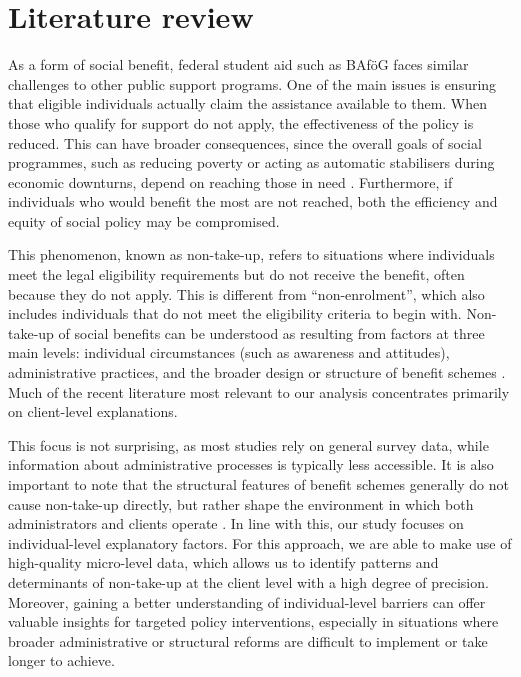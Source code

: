 \section{Literature review}
\label{section:literature_review}

As a form of social benefit, federal student aid such as BAföG faces similar challenges to other public support programs. One of the main issues is ensuring that eligible individuals actually claim the assistance available to them. When those who qualify for support do not apply, the effectiveness of the policy is reduced. This can have broader consequences, since the overall goals of social programmes, such as reducing poverty or acting as automatic stabilisers during economic downturns, depend on reaching those in need \citep{goedeme_concept_2020}. Furthermore, if individuals who would benefit the most are not reached, both the efficiency and equity of social policy may be compromised.

This phenomenon, known as non-take-up, refers to situations where individuals meet the legal eligibility requirements but do not receive the benefit, often because they do not apply.
This is different from “non-enrolment”, which also includes individuals that do not meet the eligibility criteria to begin with. Non-take-up of social benefits can be understood as resulting from factors at three main levels: individual circumstances (such as awareness and attitudes), administrative practices, and the broader design or structure of benefit schemes \citep{vanoorschot_failing_2002}. Much of the recent literature most relevant to our analysis concentrates primarily on client-level explanations. 

This focus is not surprising, as most studies rely on general survey data, while information about administrative processes is typically less accessible. It is also important to note that the structural features of benefit schemes generally do not cause non-take-up directly, but rather shape the environment in which both administrators and clients operate \citep{vanoorschot_failing_2002}. In line with this, our study focuses on individual-level explanatory factors. For this approach, we are able to make use of high-quality micro-level data, which allows us to identify patterns and determinants of non-take-up at the client level with a high degree of precision. Moreover, gaining a better understanding of individual-level barriers can offer valuable insights for targeted policy interventions, especially in situations where broader administrative or structural reforms are difficult to implement or take longer to achieve.

